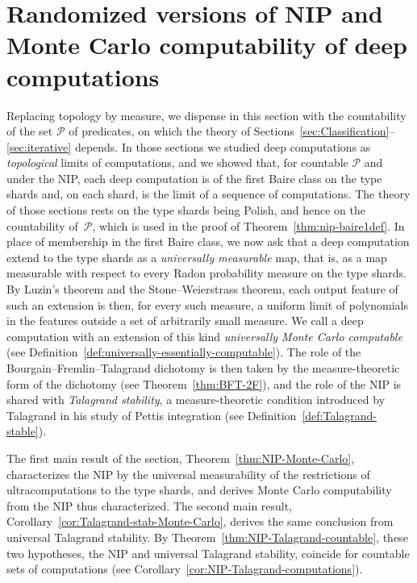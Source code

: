 \documentclass[psamsfonts]{amsart}
\theoremstyle{definition}
\theoremstyle{remark}
\numberwithin{equation}{section}
\begin{document}
\section{Randomized versions of NIP and Monte Carlo computability of deep computations}
\label{sec:measure-theoretic-NIP}

Replacing topology by measure, we dispense in this section with the countability of the set $\mathcal{P}$ of predicates, on which the theory of Sections~\ref{sec:Classification}--\ref{sec:iterative} depends.
In those sections we studied deep computations as \emph{topological} limits of computations, and we showed that, for countable $\mathcal{P}$ and under the NIP, each deep computation is of the first Baire class on the type shards and, on each shard, is the limit of a sequence of computations.
The theory of those sections rests on the type shards being Polish, and hence on the countability of~$\mathcal{P}$, which is used in the proof of Theorem~\ref{thm:nip-baire1def}.
In place of membership in the first Baire class, we now ask that a deep computation extend to the type shards as a \emph{universally measurable} map, that is, as a map measurable with respect to every Radon probability measure on the type shards.
By Luzin's theorem and the Stone--Weierstrass theorem, each output feature of such an extension is then, for every such measure, a uniform limit of polynomials in the features outside a set of arbitrarily small measure.
We call a deep computation with an extension of this kind \emph{universally Monte Carlo computable} (see Definition~\ref{def:universally-essentially-computable}).
The role of the Bourgain--Fremlin--Talagrand dichotomy is then taken by the measure-theoretic form of the dichotomy (see Theorem~\ref{thm:BFT-2F}), and the role of the NIP is shared with \emph{Talagrand stability}, a measure-theoretic condition introduced by Talagrand in his study of Pettis integration (see Definition~\ref{def:Talagrand-stable}).

The first main result of the section, Theorem~\ref{thm:NIP-Monte-Carlo}, characterizes the NIP by the universal measurability of the restrictions of ultracomputations to the type shards, and derives Monte Carlo computability from the NIP thus characterized.
The second main result, Corollary~\ref{cor:Talagrand-stab-Monte-Carlo}, derives the same conclusion from universal Talagrand stability.
By Theorem~\ref{thm:NIP-Talagrand-countable}, these two hypotheses, the NIP and universal Talagrand stability, coincide for countable sets of computations (see Corollary~\ref{cor:NIP-Talagrand-computations}).
\end{document}
